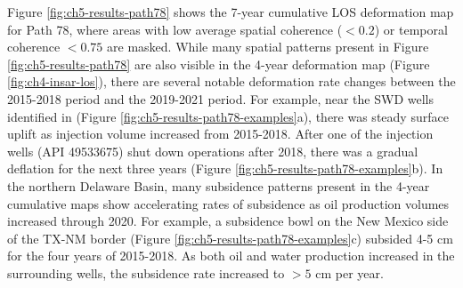 Figure \ref{fig:ch5-results-path78} shows the 7-year cumulative LOS deformation map for Path 78, where areas with low average spatial coherence ($ < 0.2 $) or temporal coherence $ < 0.75 $ are masked. 
While many spatial patterns present in Figure \ref{fig:ch5-results-path78} are also visible in the 4-year deformation map (Figure \ref{fig:ch4-insar-los}), there are several notable deformation rate changes between the 2015-2018 period and the 2019-2021 period.
For example, near the SWD wells identified in \cite{Kim2018AssociationLocalizedGeohazards} (Figure \ref{fig:ch5-results-path78-examples}a), there was steady surface uplift as injection volume increased from 2015-2018. After one of the injection wells (API 49533675) shut down operations after 2018, there was a gradual deflation for the next three years (Figure \ref{fig:ch5-results-path78-examples}b).
In the northern Delaware Basin, many subsidence patterns present in the 4-year cumulative maps show accelerating rates of subsidence as oil production volumes increased through 2020.
For example, a subsidence bowl on the New Mexico side of the TX-NM border (Figure \ref{fig:ch5-results-path78-examples}c) subsided 4-5 cm for the four years of 2015-2018. As both oil and water production increased in the surrounding wells, the subsidence rate increased to $ >5 $ cm per year.


